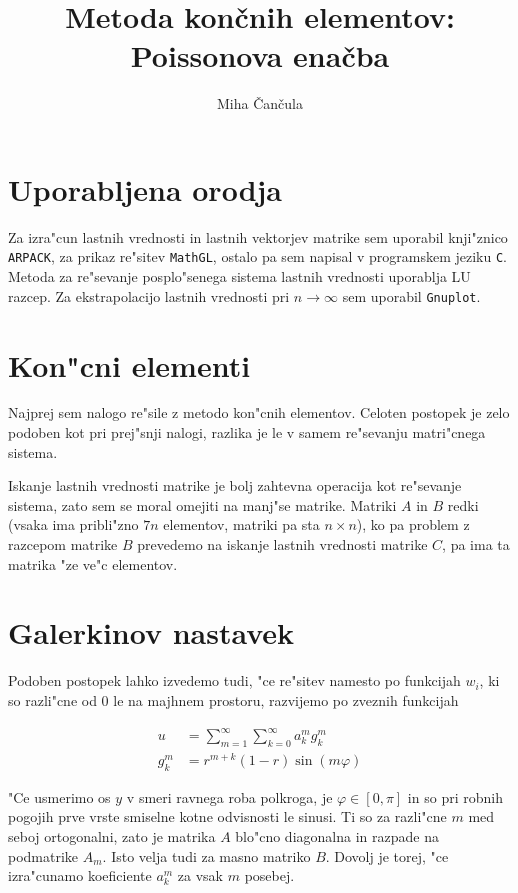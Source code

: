 \documentclass[a4paper,10pt]{article}
\title{Metoda kon\v cnih elementov: \\ Poissonova ena\v cba}
\author{Miha \v Can\v cula}
\renewcommand{\phi}{\varphi}
\begin{document}
\maketitle

\section{Uporabljena orodja}

Za izra"cun lastnih vrednosti in lastnih vektorjev matrike sem uporabil knji"znico \texttt{ARPACK}, za prikaz re"sitev \texttt{MathGL}, ostalo pa sem napisal v programskem jeziku \texttt{C}. Metoda za re"sevanje posplo"senega sistema lastnih vrednosti uporablja LU razcep. Za ekstrapolacijo lastnih vrednosti pri $n \to \infty$ sem uporabil \texttt{Gnuplot}. 

\section{Kon"cni elementi}

Najprej sem nalogo re"sile z metodo kon"cnih elementov. Celoten postopek je zelo podoben kot pri prej"snji nalogi, razlika je le v samem re"sevanju matri"cnega sistema. 

Iskanje lastnih vrednosti matrike je bolj zahtevna operacija kot re"sevanje sistema, zato sem se moral omejiti na manj"se matrike. Matriki $A$ in $B$ redki (vsaka ima pribli"zno $7n$ elementov, matriki pa sta $n\times n$), ko pa problem z razcepom matrike $B$ prevedemo na iskanje lastnih vrednosti matrike $C$, pa ima ta matrika "ze ve"c elementov. 

\section{Galerkinov nastavek}
Podoben postopek lahko izvedemo tudi, "ce re"sitev namesto po funkcijah $w_i$, ki so razli"cne od 0 le na majhnem prostoru, razvijemo po zveznih funkcijah

\begin{align}
 u &= \sum_{m=1}^{\infty} \sum_{k=0}^{\infty} a_{k}^{m} g_{k}^{m} \\
 g_{k}^{m} &= r^{m+k} (1-r) \sin(m\phi)
\end{align}

"Ce usmerimo os $y$ v smeri ravnega roba polkroga, je $\phi \in [0,\pi]$ in so pri robnih pogojih prve vrste smiselne kotne odvisnosti le sinusi. Ti so za razli"cne $m$ med seboj ortogonalni, zato je matrika $A$ blo"cno diagonalna in razpade na podmatrike $A_m$. Isto velja tudi za masno matriko $B$. Dovolj je torej, "ce izra"cunamo koeficiente $a_{k}^{m}$ za vsak $m$ posebej. 
\end{document}
